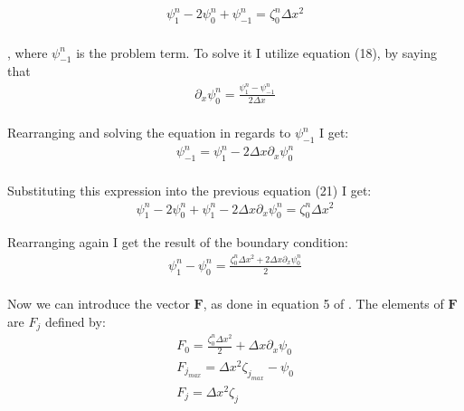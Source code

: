 \begin{align}
\psi_{1}^{n} - 2\psi_{0}^{n} + \psi_{-1}^{n} = \zeta_0^n {\Delta x^2}
\end{align}\\

, where $\psi_{-1}^{n}$ is the problem term. To solve it I utilize equation (18), by saying that\\ 

\begin{align}
\partial_x \psi_{0}^{n} = \frac{\psi_{1}^{n} - \psi_{-1}^{n}}{2\Delta x}
\end{align}\\
 
Rearranging and solving the equation in regards to 
$\psi_{-1}^{n}$ I get:\\

\begin{align}
\psi_{-1}^{n} = \psi_{1}^{n} - 2\Delta x \partial_x \psi_{0}^{n}
\end{align}\\

Substituting this expression into the previous equation (21) I get:\\

\begin{align}
\psi_{1}^{n} - 2\psi_{0}^{n} + \psi_{1}^{n} - 2\Delta x \partial_x \psi_{0}^{n} = \zeta_0^n {\Delta x^2}
\end{align}

Rearranging again I get the result of the boundary condition:\\

\begin{align}
\psi_{1}^{n} - \psi_{0}^{n}  = \frac{\zeta_0^n {\Delta x^2} + 2\Delta x \partial_x \psi_{0}^{n}}{2}
\end{align}\\

Now we can introduce the vector $\mathbf{F}$, as done in equation 5 of \cite{poisson}. The elements of $\mathbf{F}$ are $F_j$ defined by:\\

\begin{equation}
\begin{gathered}
F_0 = \frac{\zeta_0^n {\Delta x^2}}{2} + \Delta x \partial_x\psi_0\\
F_{j_{max}} = \Delta x^2 \zeta_{j_{max}} - \psi_0\\
F_j = \Delta x^2 \zeta_j
\end{gathered}
\end{equation}

